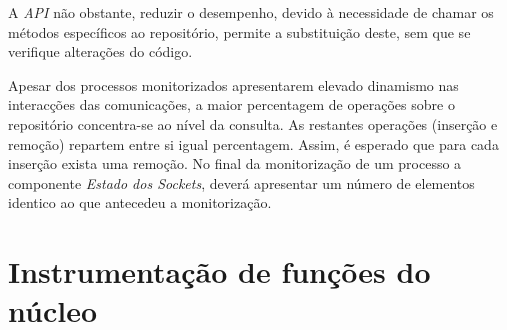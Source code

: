 A \textit{API} não obstante, reduzir o desempenho, devido à necessidade de chamar os métodos específicos ao repositório, permite a substituição deste, sem que se verifique alterações do código.

Apesar dos processos monitorizados apresentarem elevado dinamismo nas interacções das comunicações, a maior percentagem de operações sobre o repositório concentra-se ao nível da consulta.
As restantes operações (inserção e remoção) repartem entre si igual percentagem.
Assim, é esperado que para cada inserção exista uma remoção.
No final da monitorização de um processo a componente \textit{Estado dos Sockets}, deverá apresentar um número de elementos identico ao que antecedeu a monitorização.

\section{Instrumentação de funções do núcleo}








